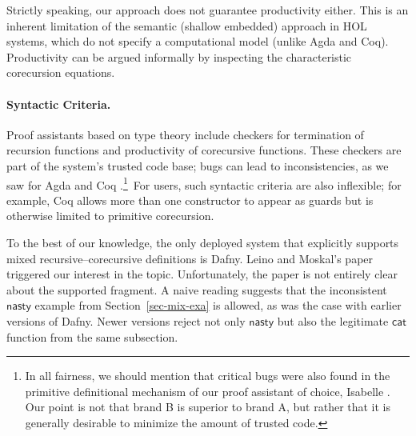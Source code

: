 \documentclass[preprint,draft]
{sigplanconf}
\newcommand{\<}{\langle}
\renewcommand{\>}{\rangle}
\newcommand{\evil}{{{\mathsf{nasty}}}}
\newcommand{\catalan}{{{\mathsf{cat}}}}
\begin{document}
Strictly speaking, our approach does not guarantee productivity either. This is an
inherent limitation of the semantic
(shallow embedded)
approach in HOL systems, which do not specify a computational model (unlike Agda and Coq).
Productivity can be argued informally by inspecting the characteristic corecursion equations.


\paragraph{Syntactic Criteria.}
Proof assistants based on type theory include checkers for termination of
recursion functions and productivity of corecursive functions. These checkers
are part of the system's trusted code base; bugs can lead to inconsistencies, as
we saw for Agda \cite{traytel-2014-agda} and Coq \cite{denes-2013-coqml}.\footnote{In all fairness, we should mention that critical bugs were also
found in the primitive definitional mechanism of our proof assistant of
choice, Isabelle \cite{kuncar-2015-cpp}. Our point is not that brand B is superior to brand A, but
rather that it is generally desirable to minimize the amount of trusted code.}
\,For users, such syntactic criteria are also inflexible; for example, Coq allows
more than one constructor to appear as guards but is otherwise limited to
primitive corecursion.

To the best of our knowledge, the only deployed system that explicitly supports mixed
recursive--corecursive definitions is Dafny. Leino and
Moskal's paper \cite{leino-moskal-2014} triggered our interest in the topic.
Unfortunately, the paper is not entirely clear about the supported fragment. A naive
reading suggests that the inconsistent $\evil$ example from
Section~\ref{sec-mix-exa} is allowed, as was the case with earlier versions of
Dafny. Newer versions reject not only $\evil$ but also the legitimate
$\catalan$ function from the same subsection.
\end{document}
